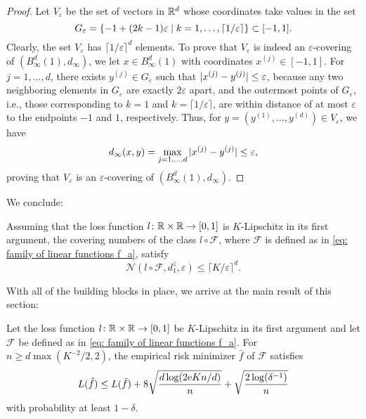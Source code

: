 \begin{proof}
Let $V_{\varepsilon}$ be the set of vectors in $\mathbb{R}^d$ whose coordinates take values in the set
\[
    G_{\varepsilon} = \set{-1 + (2k - 1)\varepsilon \with k = 1, \dots, \lceil 1 / \varepsilon \rceil} \subset [-1, 1].
\]
Clearly, the set $V_{\varepsilon}$ has $\lceil 1 / \varepsilon \rceil^d$ elements. To prove that $V_{\varepsilon}$ is indeed an $\varepsilon$-covering of $(B_{\infty}^d(1), d_{\infty})$, we let $x \in B_{\infty}^d(1)$ with coordinates $x^{(j)} \in [-1, 1]$. For $j = 1, \dots, d$, there exists $y^{(j)} \in G_{\varepsilon}$ such that $\abs*{x^{(j)} - y^{(j)}} \leq \varepsilon$, because any two neighboring elements in $G_{\varepsilon}$ are exactly $2 \varepsilon$ apart, and the outermost points of $G_{\varepsilon}$, i.e., those corresponding to $k = 1$ and $k = \lceil 1 / \varepsilon \rceil$, are within distance of at most $\varepsilon$ to the endpoints $-1$ and $1$, respectively. Thus, for $y = (y^{(1)}, \dots, y^{(d)}) \in V_{\varepsilon}$, we have
\[
    d_{\infty}(x, y) = \max_{j = 1, \dots, d} \abs*{x^{(j)} - y^{(j)}} \leq \varepsilon,
\]
proving that $V_{\varepsilon}$ is an $\varepsilon$-covering of $(B_{\infty}^d(1), d_{\infty})$.
\end{proof}

We conclude:

\begin{corollary}
\label{cor: final bound on covering numbers of linear functions}
Assuming that the loss function $l \colon \mathbb{R} \times \mathbb{R} \to [0, 1]$ is $K$-Lipschitz in its first argument, the covering numbers of the class $l \circ \mathcal{F}$, where $\mathcal{F}$ is defined as in \eqref{eq: family of linear functions f_a}, satisfy
\[
    \mathcal{N}(l \circ \mathcal{F}, d_1^z, \varepsilon) \leq {\lceil K / \varepsilon \rceil}^d.
\]
\end{corollary}

With all of the building blocks in place, we arrive at the main result of this section:

\begin{theorem}
Let the loss function $l \colon \mathbb{R} \times \mathbb{R} \to [0, 1]$ be $K$-Lipschitz in its first argument and let $\mathcal{F}$ be defined as in \eqref{eq: family of linear functions f_a}. For $n \geq d \max(K^{-2}/2, 2)$, the empirical risk minimizer $\hat{f}$ of $\mathcal{F}$ satisfies
\[
    L(\hat{f}) \leq L(\bar{f}) + 8 \sqrt{\frac{d \log(2\mathrm{e} Kn / d)}{n}} + \sqrt{\frac{2 \log(\delta^{-1})}{n}}
\]
with probability at least $1 - \delta$.
\end{theorem}

